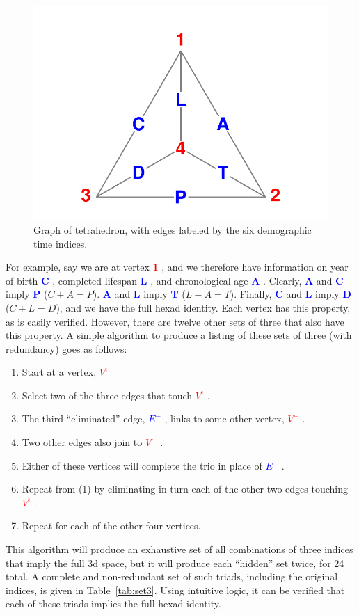 \documentclass[11pt,oneside]{article} %
\newcommand\vt[1]{%
 \textcolor{red}{\textbf{#1}\hspace{-.3em}}
}
\newcommand\eg[1]{%
 \textcolor{blue}{\textbf{#1}\hspace{-.3em}}
}
\begin{document}
\begin{figure}[h!]
\centering
\caption{Graph of tetrahedron, with edges labeled by the six demographic time
indices.}
\label{fig:tet}
\includegraphics[scale=1]{Figures/TetraHedronVerticesEdges.pdf}
\end{figure}

For example, say we are at vertex \vt{1}, and we therefore have
information on year of birth \eg{C}, completed lifespan \eg{L}, and
chronological age \eg{A}. Clearly, \eg{A} and \eg{C} imply \eg{P} ($C+A=P$).
\eg{A} and \eg{L} imply \eg{T} ($L-A=T$). Finally, \eg{C} and \eg{L} imply
\eg{D} ($C+L=D$), and we have the full hexad
identity. Each vertex has this property, as is easily verified. However,
there are twelve other sets of three that also have this property. A simple algorithm to produce a listing of these sets of three (with
redundancy) goes as follows:
\begin{enumerate}
  \item Start at a vertex, \vt{$V^i$}
  \item Select two of the three edges that touch \vt{$V^i$}.
  \item The third ``eliminated'' edge, \eg{$E^-$}, links to some other vertex,
  \vt{$V^-$}.
  \item Two other edges also join to \vt{$V^-$}.
  \item Either of these vertices will complete the trio in place of \eg{$E^-$}.
  \item Repeat from (1) by eliminating in turn each of the other two edges
  touching \vt{$V^i$}.
  \item Repeat for each of the other four vertices.
\end{enumerate}
This algorithm will produce an exhaustive set of all combinations of three
indices that imply the full 3d space, but it will produce each ``hidden'' set
twice, for 24 total. A complete and non-redundant set of such triads, including the original
indices, is given in Table~\ref{tab:set3}. Using intuitive logic, it can be
verified that each of these triads implies the full hexad identity.
\end{document}
